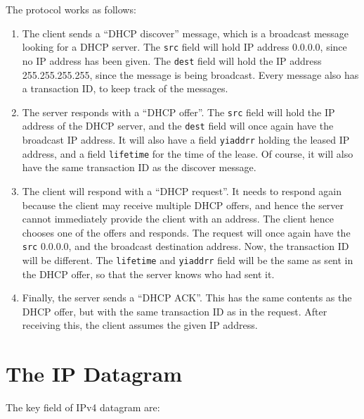 \documentclass[12pt,letterpaper]{book}
\theoremstyle{definition}
\begin{document}
The protocol works as follows:

\begin{enumerate}
  \item The client sends a ``DHCP discover'' message, which is a broadcast message looking for a DHCP server. The \texttt{src} field will hold IP address 0.0.0.0, since no IP address has been given. The \texttt{dest} field will hold the IP address 255.255.255.255, since the message is being broadcast. Every message also has a transaction ID, to keep track of the messages.
  \item The server responds with a ``DHCP offer''. The \texttt{src} field will hold the IP address of the DHCP server, and the \texttt{dest} field will once again have the broadcast IP address. It will also have a field \texttt{yiaddrr} holding the leased IP address, and a field \texttt{lifetime} for the time of the lease. Of course, it will also have the same transaction ID as the discover message.
  \item The client will respond with a ``DHCP request''. It needs to respond again because the client may receive multiple DHCP offers, and hence the server cannot immediately provide the client with an address. The client hence chooses one of the offers and responds. The request will once again have the \texttt{src} 0.0.0.0, and the broadcast destination address. Now, the transaction ID will be different. The \texttt{lifetime} and \texttt{yiaddrr} field will be the same as sent in the DHCP offer, so that the server knows who had sent it.
  \item Finally, the server sends a ``DHCP ACK''. This has the same contents as the DHCP offer, but with the same transaction ID as in the request. After receiving this, the client assumes the given IP address.
\end{enumerate}

\section{The IP Datagram}

The key field of IPv4 datagram are:
\end{document}
